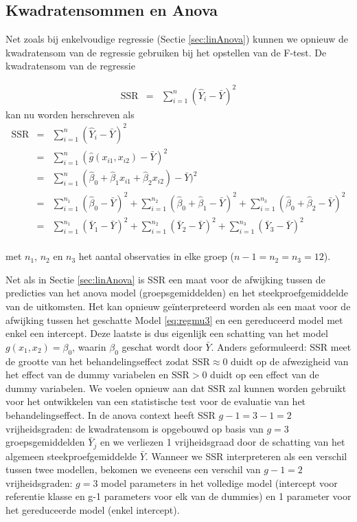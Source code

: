\documentclass[
  12pt,dutch,coursenotes]{book}
\begin{document}
\hypertarget{kwadratensommen-en-anova}{%
\subsection{Kwadratensommen en Anova}\label{kwadratensommen-en-anova}}

Net zoals bij enkelvoudige regressie (Sectie \ref{sec:linAnova}) kunnen we opnieuw de kwadratensom van de regressie gebruiken bij het opstellen van de F-test.
De kwadratensom van de regressie

\begin{eqnarray*}
\text{SSR}&=&\sum\limits_{i=1}^n (\hat Y_{i} -\bar Y)^2
\end{eqnarray*}
kan nu worden herschreven als
\begin{eqnarray*}
\text{SSR}&=&\sum\limits_{i=1}^n (\hat Y_i -\bar Y)^2\\
&=& \sum\limits_{i=1}^n (\hat{g} (x_{i1},x_{i2}) - \bar Y)^2\\
&=& \sum\limits_{i=1}^n (\hat\beta_0+\hat\beta_1x_{i1}+\hat\beta_2x_{i2}) - \bar Y)^2\\
&=& \sum\limits_{i=1}^{n_1} (\hat\beta_0 - \bar Y)^2 +\sum\limits_{i=1}^{n_2} (\hat\beta_0 + \hat\beta_1 - \bar Y)^2+\sum\limits_{i=1}^{n_3} (\hat\beta_0 + \hat\beta_2 - \bar Y)^2\\
&=& \sum\limits_{i=1}^{n_1} (\bar Y_1- \bar Y)^2 +\sum\limits_{i=1}^{n_2} (\bar Y_2- \bar Y)^2+\sum\limits_{i=1}^{n_3} (\bar Y_3 - \bar Y)^2\\
\end{eqnarray*}

met \(n_1\), \(n_2\) en \(n_3\) het aantal observaties in elke groep (\(n-1=n_2=n_3=12\)).

Net als in Sectie \ref{sec:linAnova} is SSR een maat voor de afwijking tussen de predicties van het anova model (groepsgemiddelden) en het steekproefgemiddelde van de uitkomsten.
Het kan opnieuw geïnterpreteerd worden als een maat voor de afwijking tussen het geschatte Model \eqref{eq:regmu3} en een gereduceerd model met enkel een intercept.
Deze laatste is dus eigenlijk een schatting van het model \(g(x_1,x_2)=\beta_0\), waarin \(\beta_0\) geschat wordt door \(\bar{Y}\).
Anders geformuleerd: SSR meet de grootte van het behandelingseffect zodat \(\text{SSR} \approx 0\) duidt op de afwezigheid van het effect van de dummy variabelen en \(\text{SSR}>0\) duidt op een effect van de dummy variabelen. We voelen opnieuw aan dat \(\text{SSR}\) zal kunnen worden gebruikt voor het ontwikkelen van een statistische test voor de evaluatie van het behandelingseffect.
In de anova context heeft SSR \(g-1=3-1=2\) vrijheidsgraden: de kwadratensom is opgebouwd op basis van \(g=3\) groepsgemiddelden \(\bar Y_j\) en we verliezen 1 vrijheidsgraad door de schatting van het algemeen steekproefgemiddelde \(\bar Y\).
Wanneer we SSR interpreteren als een verschil tussen twee modellen, bekomen we eveneens een verschil van \(g-1=2\) vrijheidsgraden: \(g=3\) model parameters in het volledige model (intercept voor referentie klasse en g-1 parameters voor elk van de dummies) en 1 parameter voor het gereduceerde model (enkel intercept).
\end{document}
